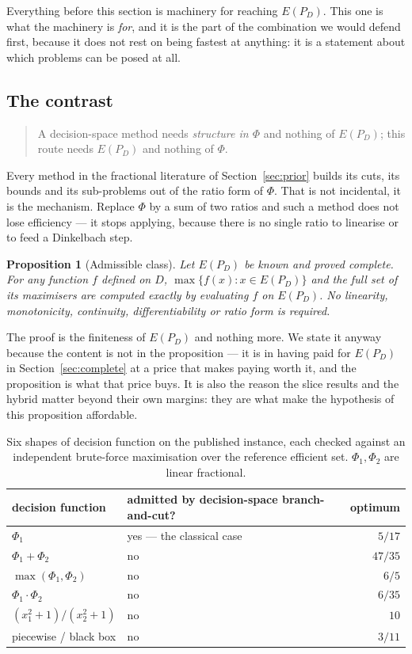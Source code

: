 \documentclass[11pt,a4paper]{article}
\newtheorem{proposition}{Proposition}
\newcommand{\Dset}{D}
\newcommand{\E}{E(P_{\Dset})}
\begin{document}
Everything before this section is machinery for reaching $\E$.  This one is
what the machinery is \emph{for}, and it is the part of the combination we
would defend first, because it does not rest on being fastest at anything: it
is a statement about which problems can be posed at all.

\subsection{The contrast}

\begin{quote}
A decision-space method needs \emph{structure in $\Phi$} and nothing of $\E$;
this route needs \emph{$\E$} and nothing of $\Phi$.
\end{quote}

\noindent
Every method in the fractional literature of Section~\ref{sec:prior} builds its
cuts, its bounds and its sub-problems out of the ratio form of $\Phi$.  That is
not incidental, it is the mechanism.  Replace $\Phi$ by a sum of two ratios and
such a method does not lose efficiency --- it stops applying, because there is
no single ratio to linearise or to feed a Dinkelbach step.

\begin{proposition}[Admissible class]\label{prop:admissible}
Let $\E$ be known and proved complete.  For \emph{any} function $f$ defined on
$\Dset$, $\max\{f(x) : x \in \E\}$ and the full set of its maximisers are
computed exactly by evaluating $f$ on $\E$.  No linearity, monotonicity,
continuity, differentiability or ratio form is required.
\end{proposition}

\noindent
The proof is the finiteness of $\E$ and nothing more.  We state it anyway
because the content is not in the proposition --- it is in having paid for
$\E$ in Section~\ref{sec:complete} at a price that makes paying worth it, and
the proposition is what that price buys.  It is also the reason the slice
results and the hybrid matter beyond their own margins: they are what make the
hypothesis of this proposition affordable.

\begin{table}[h]
\centering
\caption{Six shapes of decision function on the published instance, each
checked against an independent brute-force maximisation over the reference
efficient set.  $\Phi_1,\Phi_2$ are linear fractional.}
\begin{tabular}{llr}
\toprule
decision function & admitted by decision-space branch-and-cut? & optimum \\
\midrule
$\Phi_1$                        & yes --- the classical case & $5/17$ \\
$\Phi_1 + \Phi_2$               & no & $47/35$ \\
$\max(\Phi_1,\Phi_2)$           & no & $6/5$ \\
$\Phi_1 \cdot \Phi_2$           & no & $6/35$ \\
$(x_1^2+1)/(x_2^2+1)$           & no & $10$ \\
piecewise / black box           & no & $3/11$ \\
\bottomrule
\end{tabular}
\end{table}
\end{document}
